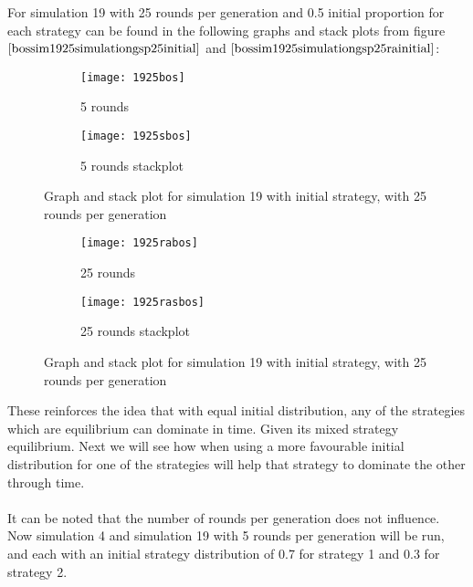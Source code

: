For simulation 19 with 25 rounds per generation and 0.5 initial proportion for each strategy can be found in the following graphs and stack plots from figure $\ref{bossim1925simulationgsp25initial}$ and $\ref{bossim1925simulationgsp25rainitial}$:

\begin{figure}[H]       
    \centering
    \begin{subfigure}[b]{0.3\textwidth}
	\centering
	{\texttt{[image: 1925bos]}}   
    	\caption{5 rounds}
	\label{fig:bossim1925r25}
    \end{subfigure}
    \hfill
    \begin{subfigure}[b]{0.3\textwidth}
	\centering
	{\texttt{[image: 1925sbos]}}   
    	\caption{5 rounds stackplot}
	\label{fig:bossim1925rs25}
    \end{subfigure}
    \caption{Graph and stack plot for simulation 19 with initial strategy, with 25 rounds per generation}
    \label{bossim1925simulationgsp25initial}
\end{figure}

\begin{figure}[H]       
    \centering
    \begin{subfigure}[b]{0.3\textwidth}
	\centering
	{\texttt{[image: 1925rabos]}}   
    	\caption{25 rounds}
	\label{fig:bossim1925ra}
    \end{subfigure}
    \hfill
    \begin{subfigure}[b]{0.3\textwidth}
	\centering
	{\texttt{[image: 1925rasbos]}}   
    	\caption{25 rounds stackplot}
	\label{fig:bossim1925ras}
    \end{subfigure}
    \caption{Graph and stack plot for simulation 19 with initial strategy, with 25 rounds per generation}
    \label{bossim1925simulationgsp25rainitial}
\end{figure}

These reinforces the idea that with equal initial distribution, any of the strategies which are equilibrium can dominate in time. Given its mixed strategy equilibrium. Next we will see how when using a more favourable initial distribution for one of the strategies will help that strategy to dominate the other through time.
\\\\It can be noted that the number of rounds per generation does not influence. Now simulation 4 and simulation 19  with 5 rounds per generation will be run, and each with an initial strategy distribution of 0.7 for strategy 1 and 0.3 for strategy 2.

